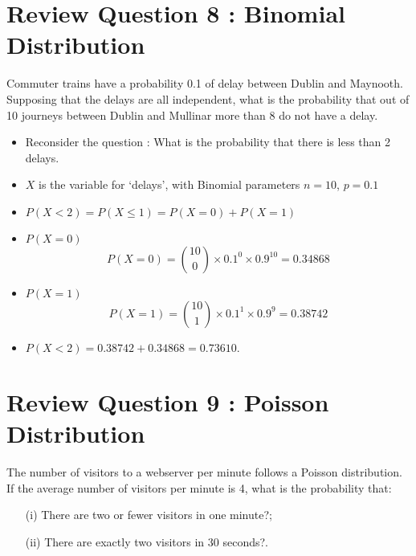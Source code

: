 
%


\large 

\section{Review Question 8 :  Binomial Distribution}
Commuter trains have a probability 0.1 of delay
between Dublin and Maynooth. Supposing that the delays are all independent,
what is the probability that out of 10 journeys between Dublin and
Mullinar more than 8 do not have a delay.
\begin{itemize}
\item Reconsider the question : What is the probability that there is less than 2 delays.
\item $X$ is the variable for `delays', with Binomial parameters $n=10$, $p=0.1$
\item $P(X < 2) = P(X \leq 1) = P(X=0)+P(X=1)$
\item $P(X=0)$
\[P(X=0)= {10 \choose 0} \times 0.1^0  \times 0.9^10 = 0.34868\]
\item $P(X=1)$
\[P(X=1)= {10 \choose 1} \times 0.1^1  \times 0.9^9 = 0.38742\]
\item $P(X < 2) = 0.38742 + 0.34868 = 0.73610.$
\end{itemize}


\section{Review Question 9 :  Poisson Distribution}
The number of visitors to a webserver per minute follows a Poisson
distribution. If the average number of visitors per minute is 4,
what is the probability that:
\begin{itemize}
\item[(i)] There are two or fewer visitors in one minute?;
\item[(ii)] There are exactly two visitors in 30 seconds?.
\end{itemize}




